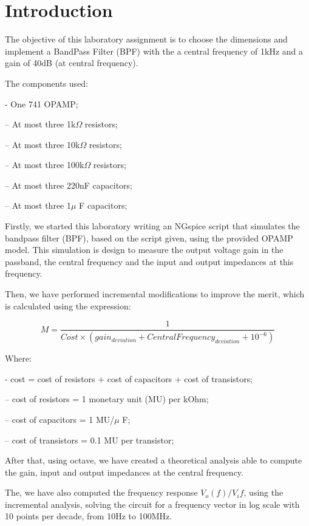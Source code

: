 \section{Introduction}
\label{sec:introduction}

The objective of this laboratory assignment is to choose the dimensions and implement a BandPass Filter (BPF) with the a central frequency of 1kHz and a gain of 40dB (at central frequency). \par
The components used:\par
- One 741 OPAMP; \par
– At most three 1k$\Omega$ resistors; \par
– At most three 10k$\Omega$  resistors; \par
– At most three 100k$\Omega$  resistors; \par
– At most three 220nF capacitors;\par
– At most three 1$\mu$ F capacitors; \par

Firstly, we started this laboratory writing an NGspice script that simulates the bandpass filter (BPF), based on the script given, using the provided OPAMP model. This simulation is design to measure the output voltage gain in the passband, the central frequency and the input and output impedances at this frequency. \par
Then, we have performed incremental modifications to improve the merit, which is calculated using the expression: \par
\begin{equation}
    M = \frac{1}{Cost \times (gain_{deviation} + CentralFrequency_{deviation} + 10^{-6})}
\end{equation}\par
Where:\par
- cost = cost of resistors + cost of capacitors + cost of transistors; \par
– cost of resistors = 1 monetary unit (MU) per kOhm; \par
– cost of capacitors = 1 MU/$\mu$ F; \par
– cost of transistors = 0.1 MU per transistor; \par

After that, using octave, we have created a theoretical analysis able to compute the gain, input and output impedances at the central frequency. \par
The, we have also computed the frequency response $V_{o}(f)/V_i{f}$, using the incremental analysis, solving the circuit for a frequency vector in log scale with 10 points per decade, from 10Hz to 100MHz.\par

